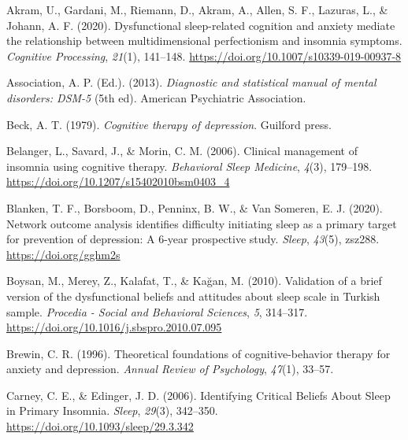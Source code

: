 \documentclass[
  ,doc,11pt, twoside,floatsintext]{apa6}
\newlength{\cslhangindent}
\newlength{\cslentryspacingunit} %
\newenvironment{CSLReferences}[2] %
 {%
  \setlength{\parindent}{0pt}
  \ifodd #1
  \let\oldpar\par
  \def\par{\hangindent=\cslhangindent\oldpar}
  \fi
  \setlength{\parskip}{#2\cslentryspacingunit}
 }%
 {}
\begin{document}
\hypertarget{refs}{}
\begin{CSLReferences}{1}{0}
\leavevmode{}%
Akram, U., Gardani, M., Riemann, D., Akram, A., Allen, S. F., Lazuras, L., \& Johann, A. F. (2020). Dysfunctional sleep-related cognition and anxiety mediate the relationship between multidimensional perfectionism and insomnia symptoms. \emph{Cognitive Processing}, \emph{21}(1), 141--148. \url{https://doi.org/10.1007/s10339-019-00937-8}

\leavevmode{}%
Association, A. P. (Ed.). (2013). \emph{Diagnostic and statistical manual of mental disorders: {DSM}-5} (5th ed). {American Psychiatric Association}.

\leavevmode{}%
Beck, A. T. (1979). \emph{Cognitive therapy of depression}. Guilford press.

\leavevmode{}%
Belanger, L., Savard, J., \& Morin, C. M. (2006). Clinical management of insomnia using cognitive therapy. \emph{Behavioral Sleep Medicine}, \emph{4}(3), 179--198. \url{https://doi.org/10.1207/s15402010bsm0403_4}

\leavevmode{}%
Blanken, T. F., Borsboom, D., Penninx, B. W., \& Van Someren, E. J. (2020). Network outcome analysis identifies difficulty initiating sleep as a primary target for prevention of depression: A 6-year prospective study. \emph{Sleep}, \emph{43}(5), zsz288. \url{https://doi.org/gghm2s}

\leavevmode{}%
Boysan, M., Merey, Z., Kalafat, T., \& Kağan, M. (2010). Validation of a brief version of the dysfunctional beliefs and attitudes about sleep scale in {Turkish} sample. \emph{Procedia - Social and Behavioral Sciences}, \emph{5}, 314--317. \url{https://doi.org/10.1016/j.sbspro.2010.07.095}

\leavevmode{}%
Brewin, C. R. (1996). Theoretical foundations of cognitive-behavior therapy for anxiety and depression. \emph{Annual Review of Psychology}, \emph{47}(1), 33--57.

\leavevmode{}%
Carney, C. E., \& Edinger, J. D. (2006). Identifying {Critical Beliefs About Sleep} in {Primary Insomnia}. \emph{Sleep}, \emph{29}(3), 342--350. \url{https://doi.org/10.1093/sleep/29.3.342}


\end{CSLReferences}
\end{document}
